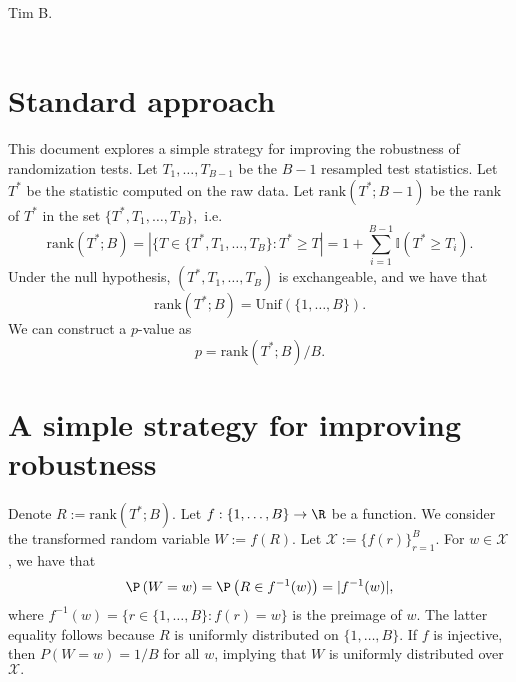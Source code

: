 \documentclass[12pt]{article}
\begin{document}
\noindent Tim B.
\\ \\ \noindent

\section{Standard approach}
This document explores a simple strategy for improving the robustness of randomization tests. Let $T_1, \dots, T_{B-1}$ be the $B-1$ resampled test statistics. Let $T^*$ be the statistic computed on the raw data. Let $\textrm{rank}(T^*; {B-1})$ be the rank of $T^*$ in the set $\{ T^*, T_1, \dots, T_{B}\},$
i.e.
$$ \textrm{rank}(T^*; B) = | \{ T \in \{ T^*, T_1, \dots, T_B  \} : T^* \geq T |  = 1 + \sum_{i=1}^{B-1} \mathbb{I}(T^* \geq T_i).$$
Under the null hypothesis, $(T^*, T_1, \dots, T_B)$ is exchangeable, and we have that
$$ \textrm{rank}(T^*; B) = \textrm{Unif}(\{1, \dots, B\}).$$
We can construct a $p$-value as
$$p = \textrm{rank}(T^*; B)/B.$$

\section{A simple strategy for improving robustness}
Denote $R := \textrm{rank}(T^*; B)$. Let $f: \{1, \dots, B\} \to \R$ be a function. We consider the transformed random variable $W := f(R)$. Let $\mathcal{X} := \{ f(r) \}_{r=1}^B .$ For $w \in \mathcal{X} $, we have that
$$\P\left(W = w\right) = \P\left( R \in f^{-1}(w) \right) = | f^{-1}(w)|,$$
where $f^{-1}(w) = \{ r \in \{1, \dots, B\} : f(r) = w \}$ is the preimage of $w$. The latter equality follows because $R$ is uniformly distributed on $\{1, \dots, B\}.$ If $f$ is injective, then $P(W = w) = 1/B$ for all $w$, implying that $W$ is uniformly distributed over $\mathcal{X}.$
 


\end{document}
